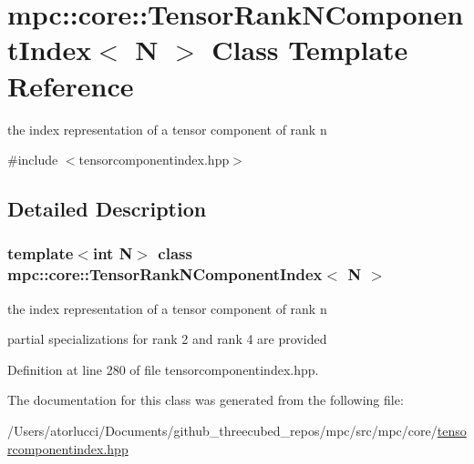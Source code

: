 \hypertarget{classmpc_1_1core_1_1_tensor_rank_n_component_index}{}\section{mpc\+:\+:core\+:\+:Tensor\+Rank\+N\+Component\+Index$<$ N $>$ Class Template Reference}
\label{classmpc_1_1core_1_1_tensor_rank_n_component_index}


the index representation of a tensor component of rank n  




{\ttfamily \#include $<$tensorcomponentindex.\+hpp$>$}



\subsection{Detailed Description}
\subsubsection*{template$<$int N$>$\newline
class mpc\+::core\+::\+Tensor\+Rank\+N\+Component\+Index$<$ N $>$}

the index representation of a tensor component of rank n 

partial specializations for rank 2 and rank 4 are provided 

Definition at line 280 of file tensorcomponentindex.\+hpp.



The documentation for this class was generated from the following file\+:\begin{DoxyCompactItemize}
\item 
/\+Users/atorlucci/\+Documents/github\+\_\+threecubed\+\_\+repos/mpc/src/mpc/core/\mbox{\hyperlink{tensorcomponentindex_8hpp}{tensorcomponentindex.\+hpp}}\end{DoxyCompactItemize}

